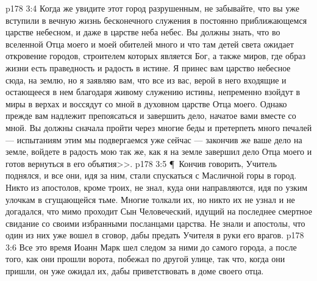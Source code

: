 \vs p178 3:4 Когда же увидите этот город разрушенным, не забывайте, что вы уже вступили в вечную жизнь бесконечного служения в постоянно приближающемся царстве небесном, и даже в царстве неба небес. Вы должны знать, что во вселенной Отца моего и моей обителей много и что там детей света ожидает откровение городов, строителем которых является Бог, а также миров, где образ жизни есть праведность и радость в истине. Я принес вам царство небесное сюда, на землю, но я заявляю вам, что все из вас, верой в него входящие и остающееся в нем благодаря живому служению истины, непременно взойдут в миры в верхах и воссядут со мной в духовном царстве Отца моего. Однако прежде вам надлежит препоясаться и завершить дело, начатое вами вместе со мной. Вы должны сначала пройти через многие беды и претерпеть много печалей --- испытаниям этим мы подвергаемся уже сейчас --- закончив же ваше дело на земле, войдете в радость мою так же, как я на земле завершил дело Отца моего и готов вернуться в его объятия>>.
\vs p178 3:5 \P\ Кончив говорить, Учитель поднялся, и все они, идя за ним, стали спускаться с Масличной горы в город. Никто из апостолов, кроме троих, не знал, куда они направляются, идя по узким улочкам в сгущающейся тьме. Многие толкали их, но никто их не узнал и не догадался, что мимо проходит Сын Человеческий, идущий на последнее смертное свидание со своими избранными посланцами царства. Не знали и апостолы, что один из них уже вошел в сговор, дабы предать Учителя в руки его врагов.
\vs p178 3:6 Все это время Иоанн Марк шел следом за ними до самого города, а после того, как они прошли ворота, побежал по другой улице, так что, когда они пришли, он уже ожидал их, дабы приветствовать в доме своего отца.
